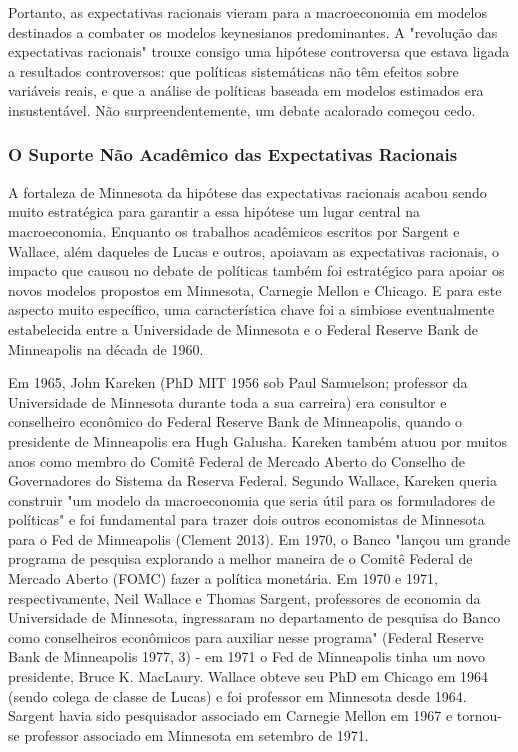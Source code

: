 \documentclass[a4paper,12pt]{article}[abntex2]
\begin{document}
Portanto, as expectativas racionais vieram para a macroeconomia em modelos destinados a combater os modelos keynesianos predominantes. A "revolução das expectativas racionais" trouxe consigo uma hipótese controversa que estava ligada a resultados controversos: que políticas sistemáticas não têm efeitos sobre variáveis reais, e que a análise de políticas baseada em modelos estimados era insustentável. Não surpreendentemente, um debate acalorado começou cedo.

\subsubsection{\textbf{O Suporte Não Acadêmico das Expectativas Racionais}}

A fortaleza de Minnesota da hipótese das expectativas racionais acabou sendo muito estratégica para garantir a essa hipótese um lugar central na macroeconomia. Enquanto os trabalhos acadêmicos escritos por Sargent e Wallace, além daqueles de Lucas e outros, apoiavam as expectativas racionais, o impacto que causou no debate de políticas também foi estratégico para apoiar os novos modelos propostos em Minnesota, Carnegie Mellon e Chicago. E para este aspecto muito específico, uma característica chave foi a simbiose eventualmente estabelecida entre a Universidade de Minnesota e o Federal Reserve Bank de Minneapolis na década de 1960.

Em 1965, John Kareken (PhD MIT 1956 sob Paul Samuelson; professor da Universidade de Minnesota durante toda a sua carreira) era consultor e conselheiro econômico do Federal Reserve Bank de Minneapolis, quando o presidente de Minneapolis era Hugh Galusha. Kareken também atuou por muitos anos como membro do Comitê Federal de Mercado Aberto do Conselho de Governadores do Sistema da Reserva Federal. Segundo Wallace, Kareken queria construir "um modelo da macroeconomia que seria útil para os formuladores de políticas" e foi fundamental para trazer dois outros economistas de Minnesota para o Fed de Minneapolis (Clement 2013). Em 1970, o Banco "lançou um grande programa de pesquisa explorando a melhor maneira de o Comitê Federal de Mercado Aberto (FOMC) fazer a política monetária. Em 1970 e 1971, respectivamente, Neil Wallace e Thomas Sargent, professores de economia da Universidade de Minnesota, ingressaram no departamento de pesquisa do Banco como conselheiros econômicos para auxiliar nesse programa" (Federal Reserve Bank de Minneapolis 1977, 3) - em 1971 o Fed de Minneapolis tinha um novo presidente, Bruce K. MacLaury. Wallace obteve seu PhD em Chicago em 1964 (sendo colega de classe de Lucas) e foi professor em Minnesota desde 1964. Sargent havia sido pesquisador associado em Carnegie Mellon em 1967 e tornou-se professor associado em Minnesota em setembro de 1971.
\end{document}

